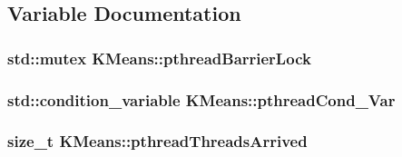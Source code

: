 \subsection{Variable Documentation}
\hypertarget{namespaceKMeans_a5219c2c9759a95b517b455049f6563de}{
\subsubsection[{pthread\-Barrier\-Lock}]{\setlength{\rightskip}{0pt plus 5cm}std\-::mutex K\-Means\-::pthread\-Barrier\-Lock}}\label{namespaceKMeans_a5219c2c9759a95b517b455049f6563de}
\hypertarget{namespaceKMeans_a1001aa3caa40eaebdd2d3d500f313348}{
\subsubsection[{pthread\-Cond\-\_\-\-Var}]{\setlength{\rightskip}{0pt plus 5cm}std\-::condition\-\_\-variable K\-Means\-::pthread\-Cond\-\_\-\-Var}}\label{namespaceKMeans_a1001aa3caa40eaebdd2d3d500f313348}
\hypertarget{namespaceKMeans_ad847e407438dfefa275c4be95c2b46ef}{
\subsubsection[{pthread\-Threads\-Arrived}]{\setlength{\rightskip}{0pt plus 5cm}size\-\_\-t K\-Means\-::pthread\-Threads\-Arrived}}\label{namespaceKMeans_ad847e407438dfefa275c4be95c2b46ef}
